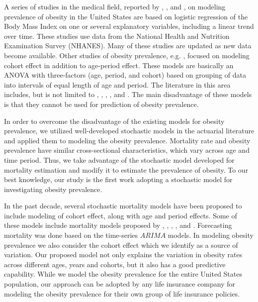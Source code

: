 \documentclass[11pt,letterpaper]{article}
\numberwithin{equation}{section}
\begin{document}
A series of studies in the medical field, reported by \cite{Ogden+Carroll+Curtin+McDowell+Tabak+Flegal:2006}, \cite{Flegal+Carroll+Ogden+Curtin:2010}, and \cite{Flegal+Carroll+Kit+Ogden:2012}, on modeling prevalence of obesity in the United States are based on logistic regression of the Body Mass Index on one or several explanatory variables, including a linear trend over time. These studies use data from the National Health and Nutrition Examination Survey (NHANES). Many of these studies are updated as new data become available. Other studies of obesity prevalence, e.g. \cite{Keyes+Utz+Robinson+Li:2010}, focused on modeling cohort effect in addition to age-period effect. These models are basically an ANOVA with three-factors (age, period, and cohort) based on grouping of data into intervals of equal length of age and period. The literature in this area includes, but is not limited to \cite{Rodgers:1982}, \cite{Glenn:2005}, \cite{Yang+Schulhofer-Wohl+Fu+Land:2008}, \cite{Keyes+Utz+Robinson+Li:2010}, and \cite{Mason+Fienberg:2012}. The main disadvantage of these models is that they cannot be used for prediction of obesity prevalence.

In order to overcome the disadvantage  of the existing models for obesity prevalence, we utilized well-developed stochastic models in the actuarial literature and applied them to modeling the obesity prevalence. Mortality rate and obesity prevalence have similar cross-sectional characteristics, which vary across age and time period. Thus, we take advantage of the stochastic model developed for mortality estimation and modify it to estimate the prevalence of obesity. To our best knowledge, our study is the first work adopting a stochastic model for investigating obesity prevalence.

In the past decade, several stochastic mortality models have been proposed to include modeling of cohort effect, along with age and period effects. Some of these models include mortality models proposed by \cite{Renshaw+Haberman:2006}, \cite{Cairns+Blake+Dowd:2006b}, \cite{Cairns+Blake+Dowd:2008a}, \cite{Cairns+Blake+Dowd+Coughlan+Epstein+Ong+Balevich:2009}, and \cite{Cairns+Blake+Dowd+Coughlan+Epstein+Khalaf+Allah:2011}. Forecasting mortality was done based on the time-series $ARIMA$ models.
In modeling obesity prevalence we also consider the cohort effect which we identify as a source of variation. Our proposed model not only explains the variation in obesity rates across different ages, years and cohorts, but it also has a good predictive capability. While we model the obesity prevalence for the entire United States population, our approach can be adopted by any life insurance company for modeling the obesity prevalence for their own group of life insurance policies.
\end{document}

